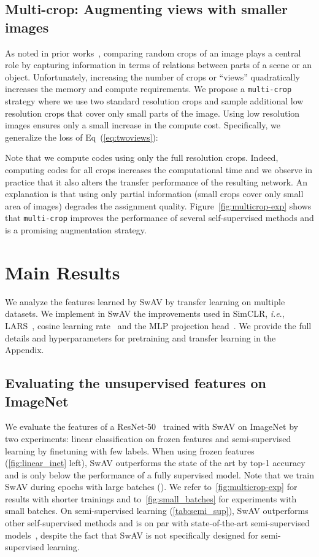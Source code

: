 \documentclass{article}
\def\onedot{.}
\def\ie{\emph{i.e}\onedot} \def\Ie{\emph{I.e}\onedot}
\def\OURS{SwAV\xspace}
\newcommand{\appendixName}{Appendix}
\begin{document}
\subsection{Multi-crop: Augmenting views with smaller images}
\label{sec:multicrop}
As noted in prior works~\cite{chen2020simple,misra2019self}, comparing random crops of an image plays a central role by capturing information in terms of relations between parts of a scene or an object. 
Unfortunately, increasing the number of crops or ``views'' quadratically increases the memory and compute requirements. 
We propose a \texttt{multi-crop} strategy where we use two standard resolution crops and sample  additional low resolution crops that cover only small parts of the image. 
Using low resolution images ensures only a small increase in the compute cost. 
Specifically, we generalize the loss of Eq~(\ref{eq:twoviews}):

Note that we compute codes using only the full resolution crops.
Indeed, computing codes for all crops increases the computational time and we observe in practice that it also alters the transfer performance of the resulting network.
An explanation is that using only partial information (small crops cover only small area of images) degrades the assignment quality.
Figure~\ref{fig:multicrop-exp} shows that \texttt{multi-crop} improves the performance of several self-supervised methods and is a promising augmentation strategy.


 
\section{Main Results}\label{sec:exp}
We analyze the features learned by \OURS by transfer learning on multiple datasets. 
We implement in \OURS the improvements used in SimCLR, \ie, LARS~\cite{you2017large}, cosine learning rate~\cite{loshchilov2016sgdr,misra2019self} and the MLP projection head~\cite{chen2020simple}. 
We provide the full details and hyperparameters for pretraining and transfer learning in the \appendixName.

\subsection{Evaluating the unsupervised features on ImageNet}
\label{sec:eval_on_imagenet}
We evaluate the features of a ResNet-50~\cite{he2016deep} trained with \OURS on ImageNet by two experiments: linear classification on frozen features and semi-supervised learning by finetuning with few labels.
When using frozen features (\cref{fig:linear_inet} left), \OURS outperforms the state of the art by  top-1 accuracy and is only  below the performance of a fully supervised model.
Note that we train \OURS during  epochs with large batches ().
We refer to~\cref{fig:multicrop-exp} for results with shorter trainings and to~\cref{fig:small_batches} for experiments with small batches.
On semi-supervised learning (\cref{tab:semi_sup}), \OURS outperforms other self-supervised methods and is on par with state-of-the-art semi-supervised models~\cite{sohn2020fixmatch}, despite the fact that \OURS is not specifically designed for semi-supervised learning.
\end{document}
